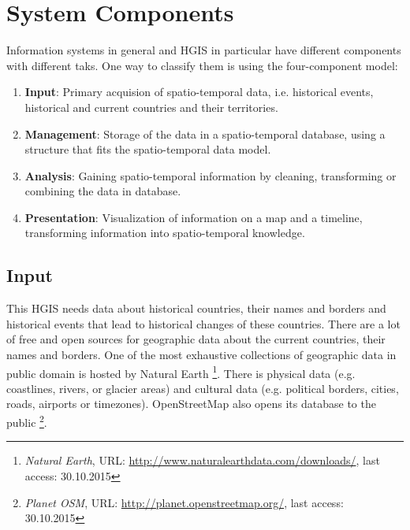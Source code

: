 
\section{System Components} %
\label{sec:system_components}

Information systems in general and HGIS in particular have different components with different taks. One way to classify them is using the four-component model:

\begin{enumerate}
  \item \textbf{Input}: Primary acquision of spatio-temporal data, i.e. historical events, historical and current countries and their territories.
  \item \textbf{Management}: Storage of the data in a spatio-temporal database, using a structure that fits the spatio-temporal data model.
  \item \textbf{Analysis}: Gaining spatio-temporal information by cleaning, transforming or combining the data in database.
  \item \textbf{Presentation}: Visualization of information on a map and a timeline, transforming information into spatio-temporal knowledge.
\end{enumerate}


\subsection{Input} %
\label{sub:input}

This HGIS needs data about historical countries, their names and borders and historical events that lead to historical changes of these countries. There are a lot of free and open sources for geographic data about the current countries, their names and borders. One of the most exhaustive collections of geographic data in public domain is hosted by Natural Earth
\footnote{
  \textit{Natural Earth},
  URL: \url{http://www.naturalearthdata.com/downloads/},
  last access: 30.10.2015
}.
There is physical data (e.g. coastlines, rivers, or glacier areas) and cultural data (e.g. political borders, cities, roads, airports or timezones). OpenStreetMap also opens its database to the public
\footnote{
  \textit{Planet OSM},
  URL: \url{http://planet.openstreetmap.org/},
  last access: 30.10.2015
}.

